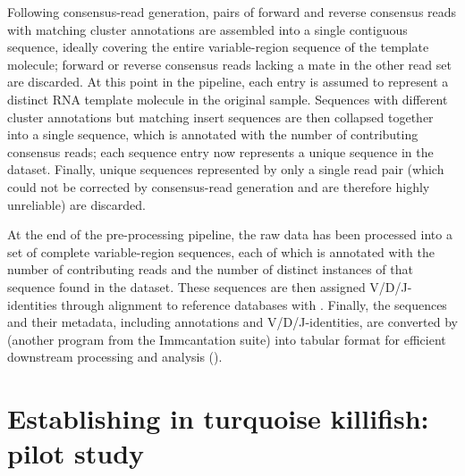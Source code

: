 Following consensus-read generation, pairs of forward and reverse consensus reads with matching cluster annotations are assembled into a single contiguous sequence, ideally covering the entire variable-region sequence of the template molecule; forward or reverse consensus reads lacking a mate in the other read set are discarded. At this point in the pipeline, each entry is assumed to represent a distinct RNA template molecule in the original sample. Sequences with different cluster annotations but matching insert sequences are then collapsed together into a single sequence, which is annotated with the number of contributing consensus reads; each sequence entry now represents a unique sequence in the dataset. Finally, unique sequences represented by only a single read pair (which could not be corrected by consensus-read generation and are therefore highly unreliable) are discarded.

At the end of the  pre-processing pipeline, the raw data has been processed into a set of complete variable-region sequences, each of which is annotated with the number of contributing reads and the number of distinct instances of that sequence found in the dataset. These sequences are then assigned V/D/J-identities through alignment to reference databases with  \parencite{ye2013igblast}. Finally, the sequences and their metadata, including annotations and V/D/J-identities, are converted by  (another program from the Immcantation suite) \parencite{gupta2015changeo} into tabular format for efficient downstream processing and analysis ().

\section{Establishing \igseq in turquoise killifish: pilot study}
\label{sec:igseq_pilot}

